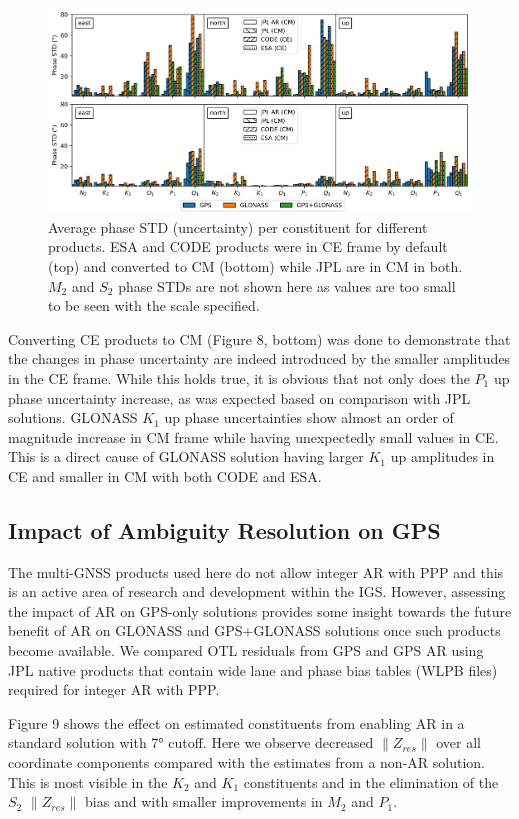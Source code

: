 \documentclass[se, manuscript]{copernicus}
\begin{document}
\begin{figure}[t]
\includegraphics[width=17cm]{fig08.png}
\caption{Average phase STD (uncertainty) per constituent for different products. ESA and CODE products were in CE frame by default (top) and converted to CM (bottom) while JPL are in CM in both. $M_2$ and $S_2$ phase STDs are not shown here as values are too small to be seen with the scale specified.}
\end{figure}
Converting CE products to CM (Figure 8, bottom) was done to demonstrate that the changes in phase uncertainty are indeed introduced by the smaller amplitudes in the CE frame. While this holds true, it is obvious that not only does the $P_1$ up phase uncertainty increase, as was expected based on comparison with JPL solutions. GLONASS $K_1$ up phase uncertainties show almost an order of magnitude increase in CM frame while having unexpectedly small values in CE. This is a direct cause of GLONASS solution having larger $K_1$ up amplitudes in CE and smaller in CM with both CODE and ESA.

\subsection{Impact of Ambiguity Resolution on GPS}
The multi-GNSS products used here do not allow integer AR with PPP and this is an active area of research and development within the IGS. However, assessing the impact of AR on GPS-only solutions provides some insight towards the future benefit of AR on GLONASS and GPS+GLONASS solutions once such products become available. We compared OTL residuals from GPS and GPS AR using JPL native products that contain wide lane and phase bias tables (WLPB files) required for integer AR with PPP.

Figure 9 shows the effect on estimated constituents from enabling AR in a standard solution with 7° cutoff. Here we observe decreased $\|Z_{res}\|$ over all coordinate components compared with the estimates from a non-AR solution. This is most visible in the $K_2$ and $K_1$ constituents and in the elimination of the $S_2$ $\|Z_{res}\|$ bias and with smaller improvements in $M_2$ and $P_1$.
\end{document}

